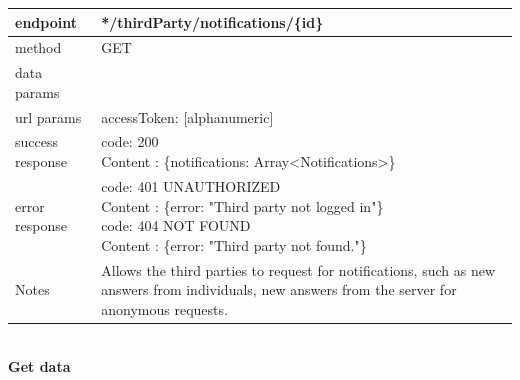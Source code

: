 \begin{legal}
\begin{legal}
\begin{itemize}
								\begin{tabularx}{\linewidth}{| l | l |}
									\hline
									endpoint & */thirdParty/notifications/\{id\} \\
									\hline
									method & GET \\
									\hline
									data params & \\
									\hline
									url params &
									\parbox{0.7\textwidth}{
										\bigskip
										accessToken: [alphanumeric]
										\bigskip
									} \\
									\hline
									success response &
									\parbox{0.7\textwidth}{
										\bigskip
										code: 200\\
										Content : \{notifications: Array<Notifications>\}
										\bigskip
									} \\
									\hline
									error response &
									\parbox{0.7\textwidth}{
										\bigskip
										code: 401 UNAUTHORIZED \\
										Content : \{error: "Third party not logged in"\}\\
										code: 404 NOT FOUND \\
										Content : \{error: "Third party not found."\}
										\bigskip
									} \\
									\hline
									Notes & 
									\parbox{0.7\textwidth}{
										\bigskip Allows the third parties to request for notifications, such as new answers from individuals, new answers from the server for anonymous requests.
									\bigskip}  \\
									\hline
								\end{tabularx}\\
								
								\textbf{Get data} \\
			

\end{itemize}
\end{legal}
\end{legal}
